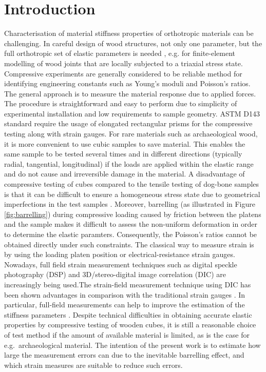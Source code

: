 \documentclass[review]{elsarticle}
\begin{document}
\linenumbers

\section{Introduction}

Characterisation of material stiffness properties of orthotropic materials can
be challenging. In  careful design of wood structures, not only one parameter, but the full
orthotropic set of elastic parameters is needed \cite{tsoumis1991science},
e.g. for finite-element modelling of wood joints that are locally subjected to a
triaxial stress state. Compressive experiments are generally considered to be
reliable method for identifying engineering constants such as Young's moduli and Poisson's ratios. The general approach is to measure the material response due to applied
forces. The procedure is straightforward and easy to perform due to simplicity of experimental installation and low requirements to sample
geometry. ASTM D143 standard \cite{standard1997d143,
johnson1983compression} require the usage of elongated rectangular prisms for
the compressive testing along with strain gauges.
For rare materials such as archaeological wood, it is more convenient to use
cubic samples \cite{ljungdahl2007transverse, vorobyevcharacterisation} to save
material.
This enables the same sample to be tested several times and in
different directions (typically radial, tangential, longitudinal) if the loads are
applied within the elastic range and do not cause and irreversible damage in the material.
A disadvantage of compressive testing of cubes compared to the tensile testing
of dog-bone samples is that it can be difficult to ensure a homogeneous stress
state due to geometrical imperfections in the test samples
\cite{Toftegaard1999849}.
Moreover, barrelling  (as illustrated in Figure \ref{fig:barrelling}) during
compressive loading \cite{oldroyd1966stress} caused by friction between the platens and the
sample makes it difficult to assess the non-uniform deformation in order to determine the elastic paramters.
Consequently, the Poisson's ratios cannot be obtained directly under such constraints. 
The classical way to measure strain is by using the loading platen position or electrical-resistance strain gauges. Nowadays, full field strain measurement techniques such
as digital speckle photography (DSP) \cite{synnergren1999stereoscopic} and
3D/stereo-digital image correlation (DIC) \cite{majano2012test} are 
increasingly being used.The strain-field measurement technique using
DIC has been shown advantages in comparison with the traditional strain gauges
\cite{huang2010optical,xavier2012stereovision}. In particular, full-field measurements can help to improve the estimation of the stiffness parameters \cite{dahl2009planar,
majano2012test, ozyhar2013moisture}. 
Despite technical difficulties in obtaining accurate elastic properties by compressive testing of wooden cubes, it is still a reasonable 
choice of test method if the amount of available material is limited, as is the case for e.g.\ archaeological material. The intention of the present work is to estimate how large the measurement errors can due to the inevitable barrelling effect, and which strain measures are suitable to reduce such errors.  \par 
\end{document}
